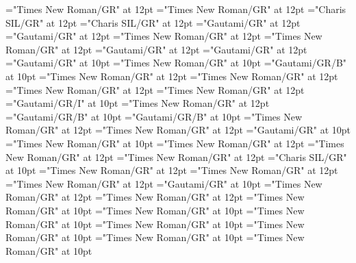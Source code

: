 \documentclass[c5paper,twoside]{article}
\begin{document}
\pagestyle{plain}
\sloppy
\setlength{\parfillskip}{0pt plus 1fil}
\font\diven="Times New Roman/GR" at 12pt
\font\spanen="Times New Roman/GR" at 12pt
\font\divggofonipaxemic="Charis SIL/GR" at 12pt
\font\spanggofonipaxemic="Charis SIL/GR" at 12pt
\font\divte="Gautami/GR" at 12pt
\font\spante="Gautami/GR" at 12pt
\font\divhi="Times New Roman/GR" at 12pt
\font\spanhi="Times New Roman/GR" at 12pt
\font\divggoTeluIN="Gautami/GR" at 12pt
\font\spanggoTeluIN="Gautami/GR" at 12pt
\font\xitemte="Gautami/GR" at 10pt
\font\xitemhi="Times New Roman/GR" at 10pt
\font\xitemxitemcomplexformformbefore="Gautami/GR/B" at 10pt
\font\xitemxitemcomplexformrefsbefore="Times New Roman/GR" at 12pt
\font\xitemxitemdefinitionbefore="Times New Roman/GR" at 12pt
\font\xitemxitementryrefcomponentbefore="Times New Roman/GR" at 12pt
\font\xitemxitementryreftypebefore="Times New Roman/GR" at 12pt
\font\xitemxitemexamplebefore="Gautami/GR/I" at 10pt
\font\xitemxitemexamplesbefore="Times New Roman/GR" at 12pt
\font\xitemxitemheadwordbefore="Gautami/GR/B" at 10pt
\font\xitemxitemLexEntrypublishStemComponentTargetMLHeadWordPubbefore="Gautami/GR/B" at 10pt
\font\xitemxitemLexEntryTypepublishStemComplexFormTypeReverseAbbrPubbefore="Times New Roman/GR" at 12pt
\font\xitemxitemLexEntryTypepublishStemEntryTypeAbbreviationPubbefore="Times New Roman/GR" at 12pt
\font\xitemxitemLexSensepublishStemGlossPubLdbefore="Gautami/GR" at 10pt
\font\xitemxitemLexSensepublishStemGlossPubLebefore="Times New Roman/GR" at 10pt
\font\xitemxitempartofspeechbefore="Times New Roman/GR" at 12pt
\font\xitemxitempictureLabelbefore="Times New Roman/GR" at 12pt
\font\xitemxitemprimaryrefsbefore="Times New Roman/GR" at 12pt
\font\xitemxitempronunciationbefore="Charis SIL/GR" at 10pt
\font\xitemxitempronunciationsbefore="Times New Roman/GR" at 12pt
\font\sensesensesensesbefore="Times New Roman/GR" at 12pt
\font\xitemxitemtranslationbefore="Times New Roman/GR" at 12pt
\font\xitemxitemtranslationLdbefore="Gautami/GR" at 10pt
\font\xitemtpi="Times New Roman/GR" at 12pt
\font{}="Times New Roman/GR" at 12pt
\font\entryletDatadicBody="Times New Roman/GR" at 10pt
\font\pictureRightentryletDatadicBody="Times New Roman/GR" at 10pt
\font\picturepictureRightentryletDatadicBody="Times New Roman/GR" at 10pt
\font\pictureCaptionpictureRightentryletDatadicBody="Times New Roman/GR" at 10pt
\font\CmPicturepublishStemPileThumbnailPubpictureCaptionpictureRightentryletDatadicBody="Times New Roman/GR" at 10pt
\font\pictureLabelenpictureCaptionpictureRightentryletDatadicBody="Times New Roman/GR" at 10pt
\font\spanenpictureLabelenpictureCaptionpictureRightentryletDatadicBody="Times New Roman/GR" at 10pt
\end{document}
